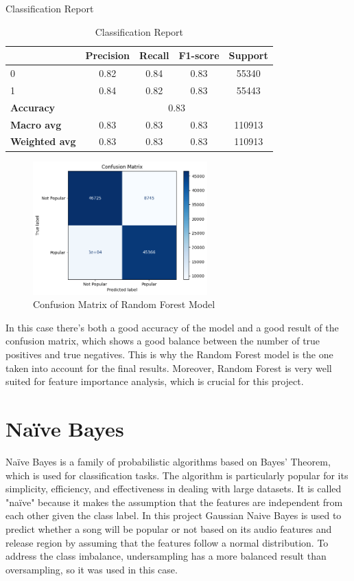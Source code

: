 \newpage
Classification Report
\begin{table}[h]
    \centering
    \begin{tabular}{lcccc}
        \toprule
        & \textbf{Precision} & \textbf{Recall} & \textbf{F1-score} & \textbf{Support} \\
        \midrule
        0 & 0.82 & 0.84 & 0.83 & 55340 \\
        1 & 0.84 & 0.82 & 0.83 & 55443 \\
        \midrule
        \textbf{Accuracy} & \multicolumn{4}{c}{0.83} \\
        \textbf{Macro avg} & 0.83 & 0.83 & 0.83& 110913 \\
        \textbf{Weighted avg} & 0.83 & 0.83 & 0.83 & 110913 \\
        \bottomrule
    \end{tabular}
    \caption{Classification Report}
    \label{tab:classification_report}
\end{table}

\begin{figure}[h] 
    \centering 
    \includegraphics[width=0.6\textwidth]{media/random_forest_conf_matrix.png}
    \caption{Confusion Matrix of Random Forest Model}

\end{figure}

In this case there's both a good accuracy of the model and a good result of the confusion matrix, which shows a good balance between the number of true positives and true negatives. This is why the Random Forest model is the one taken into account for the final results. Moreover, Random Forest is very well suited for feature importance analysis, which is crucial for this project.

\newpage
\section{Naïve Bayes}
Naïve Bayes is a family of probabilistic algorithms based on Bayes' Theorem, which is used for classification tasks.
The algorithm is particularly popular for its simplicity, efficiency, and effectiveness in dealing with large datasets.
It is called "naïve" because it makes the assumption that the features are independent from each other given the class label.
In this project Gaussian Naive Bayes is used to predict whether a song will be popular or not based on its audio features and release region by assuming that
the features follow a normal distribution. 
To address the class imbalance, undersampling has a more balanced result than oversampling, so it was used in this case.\\

